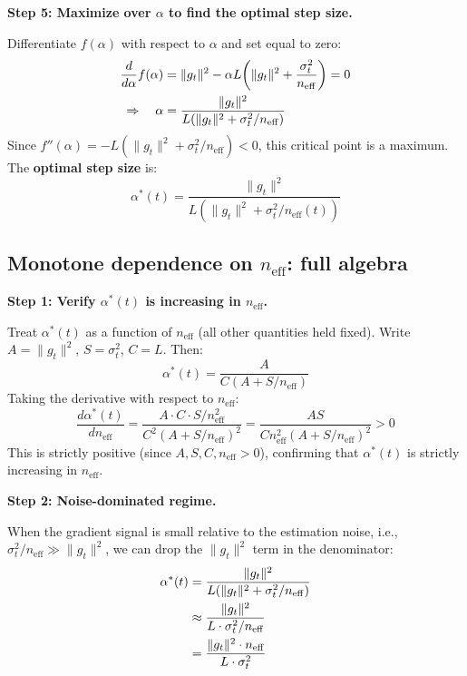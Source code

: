 \documentclass[11pt,a4paper]{article}
\newcommand{\neff}{n_{\mathrm{eff}}}
\newcommand{\gtrue}{g_t}
\newcommand{\alphaopt}{\alpha^*(t)}
\begin{document}
\textbf{Step 5: Maximize over $\alpha$ to find the optimal step size.}

Differentiate $f(\alpha)$ with respect to $\alpha$ and set equal to zero:
\begin{align}
  \frac{d}{d\alpha} f(\alpha)
  &= \|\gtrue\|^2 - \alpha L\!\left(\|\gtrue\|^2 + \frac{\sigma_t^2}{\neff}\right)
  = 0 \notag\\
  \Rightarrow\quad
  \alpha
  &= \frac{\|\gtrue\|^2}{L\!\left(\|\gtrue\|^2 + \sigma_t^2/\neff\right)}
  \label{eq:alphaopt-derivation}
\end{align}
Since $f''(\alpha) = -L(\|\gtrue\|^2 + \sigma_t^2/\neff) < 0$, this critical point is a maximum.
The \textbf{optimal step size} is:
\begin{equation}
  \boxed{
  \alphaopt
  = \frac{\|\gtrue\|^2}{L\!\left(\|\gtrue\|^2 + \sigma_t^2/\neff(t)\right)}
  }
  \label{eq:alphaopt-full}
\end{equation}

\subsection{Monotone dependence on $\neff$: full algebra}
\label{sec:monotone}

\textbf{Step 1: Verify $\alphaopt$ is increasing in $\neff$.}

Treat $\alphaopt$ as a function of $\neff$ (all other quantities held fixed).
Write $A = \|\gtrue\|^2$, $S = \sigma_t^2$, $C = L$.
Then:
\begin{equation}
  \alphaopt = \frac{A}{C(A + S/\neff)}
\end{equation}
Taking the derivative with respect to $\neff$:
\begin{equation}
  \frac{d\alphaopt}{d\neff}
  = \frac{A \cdot C \cdot S/\neff^2}{C^2(A + S/\neff)^2}
  = \frac{A S}{C \neff^2 (A + S/\neff)^2} > 0
  \label{eq:monotone}
\end{equation}
This is strictly positive (since $A, S, C, \neff > 0$), confirming that $\alphaopt$ is strictly increasing in $\neff$.

\textbf{Step 2: Noise-dominated regime.}

When the gradient signal is small relative to the estimation noise,
i.e., $\sigma_t^2/\neff \gg \|\gtrue\|^2$, we can drop the $\|\gtrue\|^2$ term in the denominator:
\begin{align}
  \alphaopt
  &= \frac{\|\gtrue\|^2}{L\!\left(\|\gtrue\|^2 + \sigma_t^2/\neff\right)} \notag\\
  &\approx \frac{\|\gtrue\|^2}{L \cdot \sigma_t^2/\neff} \notag\\
  &= \frac{\|\gtrue\|^2 \cdot \neff}{L \cdot \sigma_t^2}
  \label{eq:alphaopt-noisedom}
\end{align}
\end{document}
